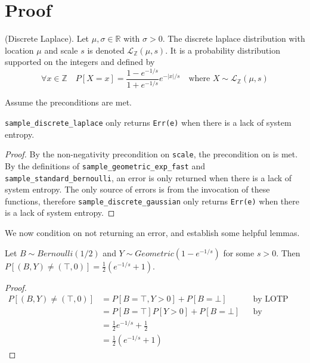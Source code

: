 \documentclass{article}
\begin{document}
\section{Proof}
\begin{definition} \cite{BV17}
    (Discrete Laplace). Let $\mu, \sigma \in \mathbb{R}$ with $\sigma > 0$. 
    The discrete laplace distribution with location $\mu$ and scale $s$ is denoted $\mathcal{L}_\mathbb{Z}(\mu, s)$. 
    It is a probability distribution supported on the integers and defined by
    \begin{equation*}
        \forall x \in \mathbb{Z} \quad  P[X = x] = \frac{1 - e^{-1/s}}{1 + e^{-1/s}} e^{-|x|/s} \quad \text{where } X \sim \mathcal{L}_\mathbb{Z}(\mu, s)
    \end{equation*}
\end{definition}

Assume the preconditions are met.

\begin{lemma}
    \label{err-e}
    \texttt{sample\_discrete\_laplace} only returns \texttt{Err(e)} when there is a lack of system entropy.
\end{lemma}

\begin{proof}
    By the non-negativity precondition on \texttt{scale},
    the precondition on  is met.
    By the definitions of \texttt{sample\_geometric\_exp\_fast} and \texttt{sample\_standard\_bernoulli}, 
    an error is only returned when there is a lack of system entropy.
    The only source of errors is from the invocation of these functions,
    therefore \texttt{sample\_discrete\_gaussian} only returns \texttt{Err(e)} when there is a lack of system entropy.
\end{proof}

We now condition on not returning an error, and establish some helpful lemmas.
\begin{lemma}\cite{CKS20}\label{P_B_Y_ne_T_0}
    Let $B \sim Bernoulli(1/2)$ and $Y \sim Geometric(1 - e^{-1/s})$ for some $s > 0$. 
    Then $P[(B, Y) \neq (\top, 0)] = \frac{1}{2} (e^{-1/s} + 1)$.
\end{lemma}

\begin{proof}
    \begin{align*}
        P[(B, Y) \neq (\top, 0)] &= P[B = \top, Y > 0] + P[B = \bot] && \text{by LOTP} \\
        &= P[B = \top] P[Y > 0] + P[B = \bot] && \text{by independence of B, Y} \\
        &= \frac{1}{2} e^{-1/s} + \frac{1}{2} \\
        &= \frac{1}{2} (e^{-1/s} + 1)
    \end{align*}
\end{proof}
\end{document}
